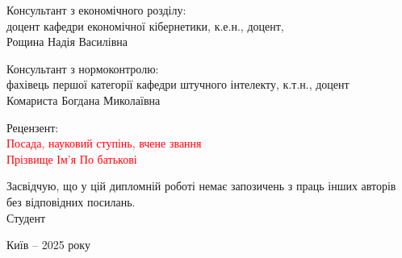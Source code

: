 \begin{titlepage}
\begin{spacing}{1}
\vspace{1ex}

\noindent
Консультант з економічного розділу:\\
доцент кафедри економічної кібернетики, к.е.н., доцент,\\
Рощина Надія Василівна \hfill \underline{\hspace{4cm}}

\vspace{1ex}

\noindent
Консультант з нормоконтролю:\\
фахівець першої категорії кафедри штучного інтелекту, к.т.н., доцент\\
Комариста Богдана Миколаївна \hfill \underline{\hspace{4cm}}

\vspace{1ex}

\noindent
Рецензент:\\
\textcolor{red}{Посада, науковий ступінь, вчене звання}\\
\textcolor{red}{Прізвище Ім’я По батькові} \hfill \underline{\hspace{4cm}}


\vspace{0.5cm}


\hfill
\begin{minipage}{0.5\textwidth}
Засвідчую, що у цій дипломній роботі немає запозичень з праць інших авторів без відповідних посилань.\\
Студент \underline{\hspace{5cm}}
\end{minipage}

\begin{center}
Київ -- 2025 року
\end{center}
\end{spacing}
\end{titlepage}



% 



